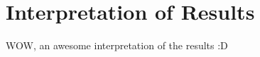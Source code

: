 \section{Interpretation of Results}
\label{sec:InterpretationOfResults}
WOW, an awesome interpretation of the results :D
